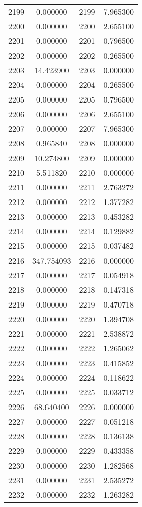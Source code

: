 \documentclass[12pt]{article}
\begin{document}
\begin{longtable}{@{}cccc@{}}
2199 & 0.000000 & 2199 & 7.965300 \\
2200 & 0.000000 & 2200 & 2.655100 \\
2201 & 0.000000 & 2201 & 0.796500 \\
2202 & 0.000000 & 2202 & 0.265500 \\
2203 & 14.423900 & 2203 & 0.000000 \\
2204 & 0.000000 & 2204 & 0.265500 \\
2205 & 0.000000 & 2205 & 0.796500 \\
2206 & 0.000000 & 2206 & 2.655100 \\
2207 & 0.000000 & 2207 & 7.965300 \\
2208 & 0.965840 & 2208 & 0.000000 \\
2209 & 10.274800 & 2209 & 0.000000 \\
2210 & 5.511820 & 2210 & 0.000000 \\
2211 & 0.000000 & 2211 & 2.763272 \\
2212 & 0.000000 & 2212 & 1.377282 \\
2213 & 0.000000 & 2213 & 0.453282 \\
2214 & 0.000000 & 2214 & 0.129882 \\
2215 & 0.000000 & 2215 & 0.037482 \\
2216 & 347.754093 & 2216 & 0.000000 \\
2217 & 0.000000 & 2217 & 0.054918 \\
2218 & 0.000000 & 2218 & 0.147318 \\
2219 & 0.000000 & 2219 & 0.470718 \\
2220 & 0.000000 & 2220 & 1.394708 \\
2221 & 0.000000 & 2221 & 2.538872 \\
2222 & 0.000000 & 2222 & 1.265062 \\
2223 & 0.000000 & 2223 & 0.415852 \\
2224 & 0.000000 & 2224 & 0.118622 \\
2225 & 0.000000 & 2225 & 0.033712 \\
2226 & 68.640400 & 2226 & 0.000000 \\
2227 & 0.000000 & 2227 & 0.051218 \\
2228 & 0.000000 & 2228 & 0.136138 \\
2229 & 0.000000 & 2229 & 0.433358 \\
2230 & 0.000000 & 2230 & 1.282568 \\
2231 & 0.000000 & 2231 & 2.535272 \\
2232 & 0.000000 & 2232 & 1.263282 \\

\end{longtable}
\end{document}
